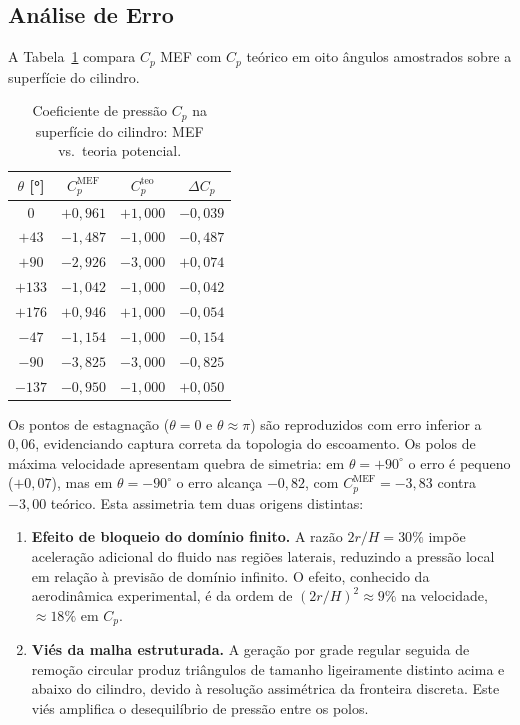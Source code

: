 \subsection{Análise de Erro}

A Tabela~\ref{tab:val_potencial_cp} compara $C_p$ MEF com $C_p$ teórico em oito ângulos amostrados sobre a superfície do cilindro.

\begin{table}[htbp]
    \centering
    \caption{Coeficiente de pressão $C_p$ na superfície do cilindro: MEF vs.\ teoria potencial.}
    \label{tab:val_potencial_cp}
    \begin{tabular}{cccc}
        \hline
        $\theta$ [°] & $C_p^{\text{MEF}}$ & $C_p^{\text{teo}}$ & $\Delta C_p$ \\
        \hline
        $0$    & $+0{,}961$ & $+1{,}000$ & $-0{,}039$ \\
        $+43$  & $-1{,}487$ & $-1{,}000$ & $-0{,}487$ \\
        $+90$  & $-2{,}926$ & $-3{,}000$ & $+0{,}074$ \\
        $+133$ & $-1{,}042$ & $-1{,}000$ & $-0{,}042$ \\
        $+176$ & $+0{,}946$ & $+1{,}000$ & $-0{,}054$ \\
        $-47$  & $-1{,}154$ & $-1{,}000$ & $-0{,}154$ \\
        $-90$  & $-3{,}825$ & $-3{,}000$ & $-0{,}825$ \\
        $-137$ & $-0{,}950$ & $-1{,}000$ & $+0{,}050$ \\
        \hline
    \end{tabular}
\end{table}

Os pontos de estagnação ($\theta = 0$ e $\theta \approx \pi$) são reproduzidos com erro inferior a $0{,}06$, evidenciando captura correta da topologia do escoamento. Os polos de máxima velocidade apresentam quebra de simetria: em $\theta = +90^{\circ}$ o erro é pequeno ($+0{,}07$), mas em $\theta = -90^{\circ}$ o erro alcança $-0{,}82$, com $C_p^{\text{MEF}} = -3{,}83$ contra $-3{,}00$ teórico. Esta assimetria tem duas origens distintas:
\begin{enumerate}
    \item \textbf{Efeito de bloqueio do domínio finito.} A razão $2r/H = 30\%$ impõe aceleração adicional do fluido nas regiões laterais, reduzindo a pressão local em relação à previsão de domínio infinito. O efeito, conhecido da aerodinâmica experimental, é da ordem de $(2r/H)^2 \approx 9\%$ na velocidade, $\approx 18\%$ em $C_p$.
    \item \textbf{Viés da malha estruturada.} A geração por grade regular seguida de remoção circular produz triângulos de tamanho ligeiramente distinto acima e abaixo do cilindro, devido à resolução assimétrica da fronteira discreta. Este viés amplifica o desequilíbrio de pressão entre os polos.
\end{enumerate}

